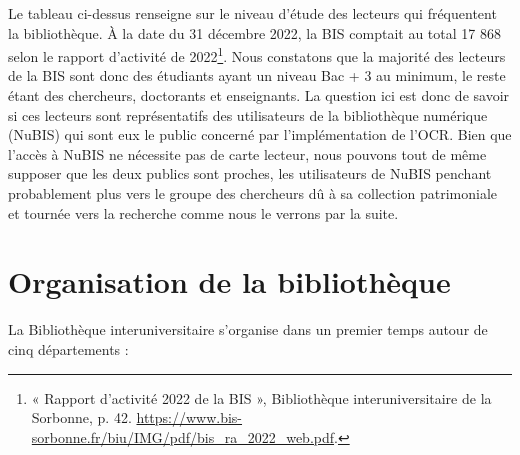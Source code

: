 \documentclass[a4paper,12pt,twoside]{book}
\begin{document}
Le tableau ci-dessus renseigne sur le niveau d'étude des lecteurs qui fréquentent la bibliothèque. À la date du 31 décembre 2022, la BIS comptait au total 17 868 selon le rapport d'activité de 2022\footnote{« Rapport d’activité 2022 de la BIS », Bibliothèque interuniversitaire de la Sorbonne, p. 42. \url{https://www.bis-sorbonne.fr/biu/IMG/pdf/bis_ra_2022_web.pdf}.}. Nous constatons que la majorité des lecteurs de la BIS sont donc des étudiants ayant un niveau Bac + 3 au minimum, le reste étant des chercheurs, doctorants et enseignants. La question ici est donc de savoir si ces lecteurs sont représentatifs des utilisateurs de la bibliothèque numérique (NuBIS) qui sont eux le public concerné par l'implémentation de l'OCR. Bien que l'accès à NuBIS ne nécessite pas de carte lecteur, nous pouvons tout de même supposer que les deux publics sont proches, les utilisateurs de NuBIS penchant probablement plus vers le groupe des chercheurs dû à sa collection patrimoniale et tournée vers la recherche comme nous le verrons par la suite.

\section{Organisation de la bibliothèque}

La Bibliothèque interuniversitaire s'organise dans un premier temps autour de cinq départements : \\
\end{document}
